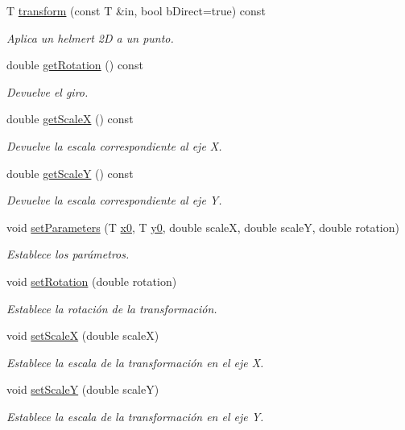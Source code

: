 \begin{DoxyCompactItemize}
T \hyperlink{group__trf2_d_group_ga8c7cfcf7b749b3adc69ebb6cfc0bb412}{transform} (const T \&in, bool b\+Direct=true) const 
\begin{DoxyCompactList}\small\item\em Aplica un helmert 2D a un punto. \end{DoxyCompactList}\item 
double \hyperlink{class_i3_d_1_1_afin_a72b19e66437e67f73b1f0a95eaa91c3f}{get\+Rotation} () const 
\begin{DoxyCompactList}\small\item\em Devuelve el giro. \end{DoxyCompactList}\item 
double \hyperlink{class_i3_d_1_1_afin_a1a4c447002e10793a6c187e028a50a13}{get\+ScaleX} () const 
\begin{DoxyCompactList}\small\item\em Devuelve la escala correspondiente al eje X. \end{DoxyCompactList}\item 
double \hyperlink{class_i3_d_1_1_afin_ad26bedc7f15fdd7e497b58cdb069cb7c}{get\+ScaleY} () const 
\begin{DoxyCompactList}\small\item\em Devuelve la escala correspondiente al eje Y. \end{DoxyCompactList}\item 
void \hyperlink{group__trf2_d_group_gaa6f479027bc96a8d58eaf52925822ecc}{set\+Parameters} (T \hyperlink{class_i3_d_1_1_afin_aff62b2c4443c19c78940f4113e67183b}{x0}, T \hyperlink{class_i3_d_1_1_afin_ac687b5efb2b75262c7aeeb31a2792c34}{y0}, double scaleX, double scaleY, double rotation)
\begin{DoxyCompactList}\small\item\em Establece los parámetros. \end{DoxyCompactList}\item 
void \hyperlink{group__trf2_d_group_ga07de5ad4be2f59ff5baa9b293211554d}{set\+Rotation} (double rotation)
\begin{DoxyCompactList}\small\item\em Establece la rotación de la transformación. \end{DoxyCompactList}\item 
void \hyperlink{group__trf2_d_group_ga33b6c90a0d7d957adb192d7768b574a1}{set\+ScaleX} (double scaleX)
\begin{DoxyCompactList}\small\item\em Establece la escala de la transformación en el eje X. \end{DoxyCompactList}\item 
void \hyperlink{group__trf2_d_group_ga2795a27b71c8e6364e71b828e042b6d7}{set\+ScaleY} (double scaleY)
\begin{DoxyCompactList}\small\item\em Establece la escala de la transformación en el eje Y. \end{DoxyCompactList}\end{DoxyCompactItemize}
